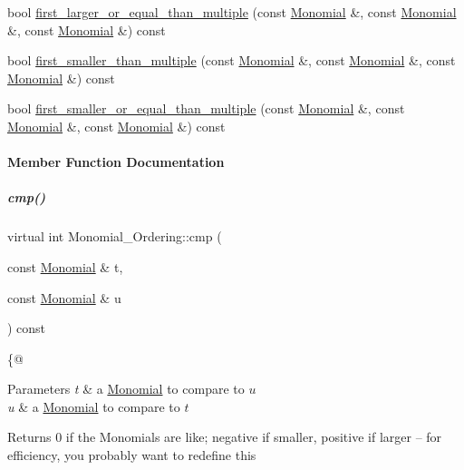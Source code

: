 \begin{Indent}
\begin{DoxyCompactItemize}
bool \hyperlink{group__orderinggroup_ad4af4c79cf46666222fe30fdd4ceb45e}{first\+\_\+larger\+\_\+or\+\_\+equal\+\_\+than\+\_\+multiple} (const \hyperlink{group__polygroup_class_monomial}{Monomial} \&, const \hyperlink{group__polygroup_class_monomial}{Monomial} \&, const \hyperlink{group__polygroup_class_monomial}{Monomial} \&) const
\item 
bool \hyperlink{group__orderinggroup_aad1ca67ca89fa85e63475d24d9f0a987}{first\+\_\+smaller\+\_\+than\+\_\+multiple} (const \hyperlink{group__polygroup_class_monomial}{Monomial} \&, const \hyperlink{group__polygroup_class_monomial}{Monomial} \&, const \hyperlink{group__polygroup_class_monomial}{Monomial} \&) const
\item 
bool \hyperlink{group__orderinggroup_a0ed5bf2b1da5daaa67aaba00f8c6cbd0}{first\+\_\+smaller\+\_\+or\+\_\+equal\+\_\+than\+\_\+multiple} (const \hyperlink{group__polygroup_class_monomial}{Monomial} \&, const \hyperlink{group__polygroup_class_monomial}{Monomial} \&, const \hyperlink{group__polygroup_class_monomial}{Monomial} \&) const
\end{DoxyCompactItemize}
\end{Indent}


\paragraph{Member Function Documentation}
\mbox{\label{group__orderinggroup_a9bc3155fc98b4d40c26118fa2114b827}} 
\subparagraph{\texorpdfstring{cmp()}{cmp()}}
{\footnotesize\ttfamily virtual int Monomial\+\_\+\+Ordering\+::cmp (\begin{DoxyParamCaption}\item[{const \hyperlink{group__polygroup_class_monomial}{Monomial} \&}]{t,  }\item[{const \hyperlink{group__polygroup_class_monomial}{Monomial} \&}]{u }\end{DoxyParamCaption}) const\hspace{0.3cm}{\ttfamily [pure virtual]}}



\{@ 


\begin{DoxyParams}{Parameters}
{\em t} & a \hyperlink{group__polygroup_class_monomial}{Monomial} to compare to $ u $ \\
\hline
{\em u} & a \hyperlink{group__polygroup_class_monomial}{Monomial} to compare to $ t $ \\
\hline
\end{DoxyParams}
\begin{DoxyReturn}{Returns}
0 if the Monomials are like; negative if smaller, positive if larger -- for efficiency, you probably want to redefine this 
\end{DoxyReturn}


